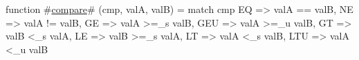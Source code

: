 function #\hyperref[sailMIPSzcompare]{compare}# (cmp, valA, valB) =
  match cmp {
    EQ   => valA ==   valB,
    NE   => valA !=   valB,
    GE   => valA >=_s valB,
    GEU  => valA >=_u valB,
    GT   => valB <_s  valA,
    LE   => valB >=_s valA,
    LT   => valA <_s  valB,
    LTU  => valA <_u  valB
  }
